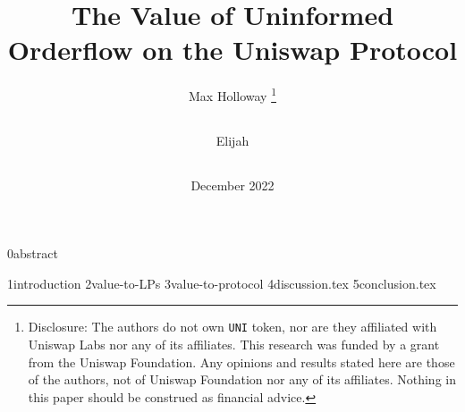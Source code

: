 \documentclass{article}
\title{The Value of Uninformed Orderflow on the Uniswap Protocol}
\author{
    Max Holloway \footnote{Disclosure: The authors do not own \texttt{UNI} token, nor are they affiliated with Uniswap Labs nor any of its affiliates. This research was funded by a grant from the Uniswap Foundation. Any opinions and results stated here are those of the authors, not of Uniswap Foundation nor any of its affiliates. Nothing in this paper should be construed as financial advice.} \\ 
    \texttt{
        \href{mailto:max@xenophonlabs.com}{\color{black}{max@xenophonlabs.com}}
    } \and
    Elijah \\
    \texttt{
        \href{mailto:elijah@duality.xyz}{\color{black}{elijah@duality.xyz}}
    }
}
\date{December 2022}
\begin{document}
    \maketitle    
    {0abstract}
    
    {1introduction}
    {2value-to-LPs}
    {3value-to-protocol}
    {4discussion.tex}
    {5conclusion.tex}
    
    \appendix
    \newpage

    \newpage
    \printbibliography
    
\end{document}
